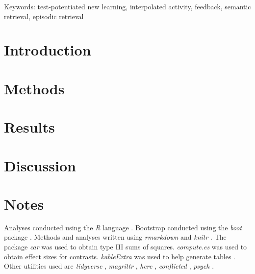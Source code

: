 \documentclass[12pt]{article}
\begin{document}
\bigskip

\noindent Keywords: test-potentiated new learning, interpolated activity, feedback,
semantic retrieval, episodic retrieval

\clearpage

\hypertarget{introduction}{%
\section{Introduction}}



\hypertarget{methods}{%
\section{Methods}}



\hypertarget{results}{%
\section{Results}}



\hypertarget{discussion}{%
\section{Discussion}}



\section{Notes}

Analyses conducted using the \textit{R} language
\citep{rcoreteamLanguageEnvironmentStatistical2019}.
Bootstrap conducted using the \textit{boot} package
\citep{cantyBootBootstrapSPlus2017}. Methods and analyses written using
\textit{rmarkdown} \citep{allaireRmarkdownDynamicDocuments2019} and
\textit{knitr} \citep{xieKnitrGeneralPurposePackage2019}. The package
\textit{car} \citep{foxCompanionAppliedRegression2011} was used to
obtain type III sums of squares. \textit{compute.es}
\citep{reComputeEsCompute2013} was used to obtain effect sizes for
contrasts. \textit{kableExtra} was used to help generate tables
\citep{zhuKableExtraConstructComplex2019}. Other utilities used are
\textit{tidyverse} \citep{wickhamTidyverseEasilyInstall2017},
\textit{magrittr} \citep{bacheMagrittrForwardPipeOperator2014},
\textit{here} \citep{mullerHereSimplerWay2017}, \textit{conflicted}
\citep{wickhamConflictedAlternativeConflict2018}, \textit{psych}
\citep{revellePsychProceduresPsychological2018}.
\end{document}
